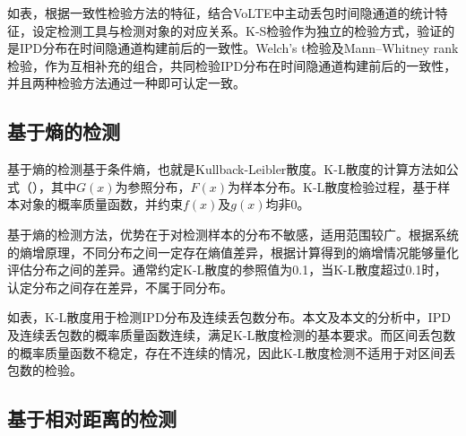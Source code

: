 如表，根据一致性检验方法的特征，结合VoLTE中主动丢包时间隐通道的统计特征，设定检测工具与检测对象的对应关系。K-S检验作为独立的检验方式，验证的是IPD分布在时间隐通道构建前后的一致性。Welch's t检验及Mann–Whitney rank检验，作为互相补充的组合，共同检验IPD分布在时间隐通道构建前后的一致性，并且两种检验方法通过一种即可认定一致。

\subsection{基于熵的检测}
\label{chap:analyze:statistical:entropy}

基于熵的检测基于条件熵，也就是Kullback-Leibler散度。K-L散度的计算方法如公式（），其中$G(x)$为参照分布，$F(x)$为样本分布。K-L散度检验过程，基于样本对象的概率质量函数，并约束$f(x)$及$g(x)$均非0。

基于熵的检测方法，优势在于对检测样本的分布不敏感，适用范围较广。根据系统的熵增原理，不同分布之间一定存在熵值差异，根据计算得到的熵增情况能够量化评估分布之间的差异。通常约定K-L散度的参照值为0.1，当K-L散度超过0.1时，认定分布之间存在差异，不属于同分布。


如表，K-L散度用于检测IPD分布及连续丢包数分布。本文及本文的分析中，IPD及连续丢包数的概率质量函数连续，满足K-L散度检测的基本要求。而区间丢包数的概率质量函数不稳定，存在不连续的情况，因此K-L散度检测不适用于对区间丢包数的检验。

\subsection{基于相对距离的检测}
\label{chap:analyze:statistical:distance}

